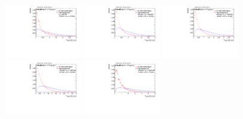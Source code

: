 \begin{figure}
\bigskip
\includegraphics[width=0.3\textwidth]{sascha_input/Appendix/Distributions/higgs/distributions/beta2/h_normal_tj_D2_2_bin1.pdf} \hspace{1mm}
\includegraphics[width=0.3\textwidth]{sascha_input/Appendix/Distributions/higgs/distributions/beta2/h_normal_tj_D2_2_bin2.pdf} \hspace{4mm}
\includegraphics[width=0.3\textwidth]{sascha_input/Appendix/Distributions/higgs/distributions/beta2/h_normal_tj_D2_2_bin3.pdf} 
\bigskip
\includegraphics[width=0.3\textwidth]{sascha_input/Appendix/Distributions/higgs/distributions/beta2/h_normal_tj_D2_2_bin4.pdf} \hspace{4mm}
\includegraphics[width=0.3\textwidth]{sascha_input/Appendix/Distributions/higgs/distributions/beta2/h_normal_tj_D2_2_bin5.pdf} 


\end{figure}
